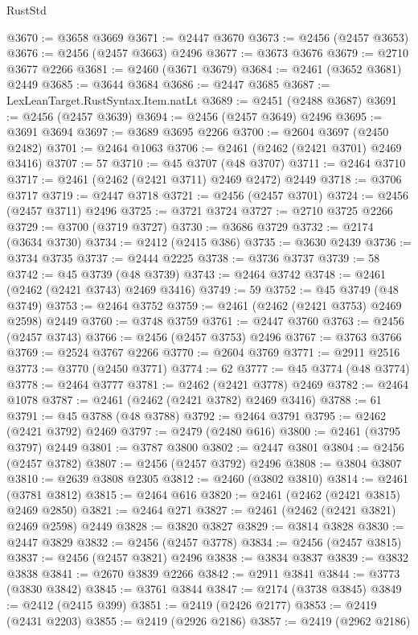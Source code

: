 \begin{lexlean}{RustStd}
\begin{coremodule}
@3670 := @3658 @3669
@3671 := @2447 @3670
@3673 := @2456 (@2457 @3653)
@3676 := @2456 (@2457 @3663) @2496
@3677 := @3673 @3676
@3679 := @2710 @3677 @2266
@3681 := @2460 (@3671 @3679)
@3684 := @2461 (@3652 @3681) @2449
@3685 := @3644 @3684
@3686 := @2447 @3685
@3687 := LexLeanTarget.RustSyntax.Item.natLt
@3689 := @2451 (@2488 @3687)
@3691 := @2456 (@2457 @3639)
@3694 := @2456 (@2457 @3649) @2496
@3695 := @3691 @3694
@3697 := @3689 @3695 @2266
@3700 := @2604 @3697 (@2450 @2482)
@3701 := @2464 @1063
@3706 := @2461 (@2462 (@2421 @3701) @2469 @3416)
@3707 := 57
@3710 := @45 @3707 (@48 @3707)
@3711 := @2464 @3710
@3717 := @2461 (@2462 (@2421 @3711) @2469 @2472) @2449
@3718 := @3706 @3717
@3719 := @2447 @3718
@3721 := @2456 (@2457 @3701)
@3724 := @2456 (@2457 @3711) @2496
@3725 := @3721 @3724
@3727 := @2710 @3725 @2266
@3729 := @3700 (@3719 @3727)
@3730 := @3686 @3729
@3732 := @2174 (@3634 @3730)
@3734 := @2412 (@2415 @386)
@3735 := @3630 @2439
@3736 := @3734 @3735
@3737 := @2444 @2225
@3738 := @3736 @3737
@3739 := 58
@3742 := @45 @3739 (@48 @3739)
@3743 := @2464 @3742
@3748 := @2461 (@2462 (@2421 @3743) @2469 @3416)
@3749 := 59
@3752 := @45 @3749 (@48 @3749)
@3753 := @2464 @3752
@3759 := @2461 (@2462 (@2421 @3753) @2469 @2598) @2449
@3760 := @3748 @3759
@3761 := @2447 @3760
@3763 := @2456 (@2457 @3743)
@3766 := @2456 (@2457 @3753) @2496
@3767 := @3763 @3766
@3769 := @2524 @3767 @2266
@3770 := @2604 @3769
@3771 := @2911 @2516
@3773 := @3770 (@2450 @3771)
@3774 := 62
@3777 := @45 @3774 (@48 @3774)
@3778 := @2464 @3777
@3781 := @2462 (@2421 @3778) @2469
@3782 := @2464 @1078
@3787 := @2461 (@2462 (@2421 @3782) @2469 @3416)
@3788 := 61
@3791 := @45 @3788 (@48 @3788)
@3792 := @2464 @3791
@3795 := @2462 (@2421 @3792) @2469
@3797 := @2479 (@2480 @616)
@3800 := @2461 (@3795 @3797) @2449
@3801 := @3787 @3800
@3802 := @2447 @3801
@3804 := @2456 (@2457 @3782)
@3807 := @2456 (@2457 @3792) @2496
@3808 := @3804 @3807
@3810 := @2639 @3808 @2305
@3812 := @2460 (@3802 @3810)
@3814 := @2461 (@3781 @3812)
@3815 := @2464 @616
@3820 := @2461 (@2462 (@2421 @3815) @2469 @2850)
@3821 := @2464 @271
@3827 := @2461 (@2462 (@2421 @3821) @2469 @2598) @2449
@3828 := @3820 @3827
@3829 := @3814 @3828
@3830 := @2447 @3829
@3832 := @2456 (@2457 @3778)
@3834 := @2456 (@2457 @3815)
@3837 := @2456 (@2457 @3821) @2496
@3838 := @3834 @3837
@3839 := @3832 @3838
@3841 := @2670 @3839 @2266
@3842 := @2911 @3841
@3844 := @3773 (@3830 @3842)
@3845 := @3761 @3844
@3847 := @2174 (@3738 @3845)
@3849 := @2412 (@2415 @399)
@3851 := @2419 (@2426 @2177)
@3853 := @2419 (@2431 @2203)
@3855 := @2419 (@2926 @2186)
@3857 := @2419 (@2962 @2186)

\end{coremodule}
\end{lexlean}
